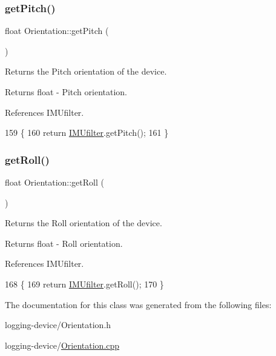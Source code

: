 \subsubsection{\texorpdfstring{get\+Pitch()}{getPitch()}}
{\footnotesize\ttfamily float Orientation\+::get\+Pitch (\begin{DoxyParamCaption}{ }\end{DoxyParamCaption})}



Returns the Pitch orientation of the device. 

\begin{DoxyReturn}{Returns}
float -\/ Pitch orientation. 
\end{DoxyReturn}


References I\+M\+Ufilter.


\begin{DoxyCode}
159 \{
160   \textcolor{keywordflow}{return} \hyperlink{class_logging_device_1_1_orientation_a517282a58a498881d97d57f4829a38d9}{IMUfilter}.getPitch();
161 \}
\end{DoxyCode}
\mbox{\label{class_logging_device_1_1_orientation_ab8923432cb8c18822b0a9ae95a5ac505}} 
\subsubsection{\texorpdfstring{get\+Roll()}{getRoll()}}
{\footnotesize\ttfamily float Orientation\+::get\+Roll (\begin{DoxyParamCaption}{ }\end{DoxyParamCaption})}



Returns the Roll orientation of the device. 

\begin{DoxyReturn}{Returns}
float -\/ Roll orientation. 
\end{DoxyReturn}


References I\+M\+Ufilter.


\begin{DoxyCode}
168 \{
169   \textcolor{keywordflow}{return} \hyperlink{class_logging_device_1_1_orientation_a517282a58a498881d97d57f4829a38d9}{IMUfilter}.getRoll();
170 \}
\end{DoxyCode}


The documentation for this class was generated from the following files\+:\begin{DoxyCompactItemize}
\item 
logging-\/device/Orientation.\+h\item 
logging-\/device/\hyperlink{_orientation_8cpp}{Orientation.\+cpp}\end{DoxyCompactItemize}
